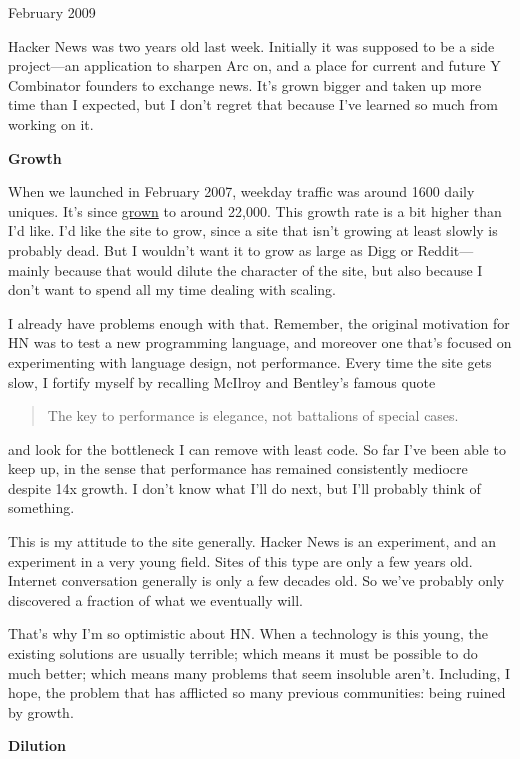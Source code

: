 February 2009

Hacker News was two years old last week. Initially it was supposed to be
a side project---an application to sharpen Arc on, and a place for
current and future Y Combinator founders to exchange news. It's grown
bigger and taken up more time than I expected, but I don't regret that
because I've learned so much from working on it.

\textbf{Growth}

When we launched in February 2007, weekday traffic was around 1600 daily
uniques. It's since
\href{http://ycombinator.com/images/2yeartraffic.png}{grown} to around
22,000. This growth rate is a bit higher than I'd like. I'd like the
site to grow, since a site that isn't growing at least slowly is
probably dead. But I wouldn't want it to grow as large as Digg or
Reddit---mainly because that would dilute the character of the site, but
also because I don't want to spend all my time dealing with scaling.

I already have problems enough with that. Remember, the original
motivation for HN was to test a new programming language, and moreover
one that's focused on experimenting with language design, not
performance. Every time the site gets slow, I fortify myself by
recalling McIlroy and Bentley's famous quote

\begin{quote}
The key to performance is elegance, not battalions of special cases.
\end{quote}

and look for the bottleneck I can remove with least code. So far I've
been able to keep up, in the sense that performance has remained
consistently mediocre despite 14x growth. I don't know what I'll do
next, but I'll probably think of something.

This is my attitude to the site generally. Hacker News is an experiment,
and an experiment in a very young field. Sites of this type are only a
few years old. Internet conversation generally is only a few decades
old. So we've probably only discovered a fraction of what we eventually
will.

That's why I'm so optimistic about HN. When a technology is this young,
the existing solutions are usually terrible; which means it must be
possible to do much better; which means many problems that seem
insoluble aren't. Including, I hope, the problem that has afflicted so
many previous communities: being ruined by growth.

\textbf{Dilution}

